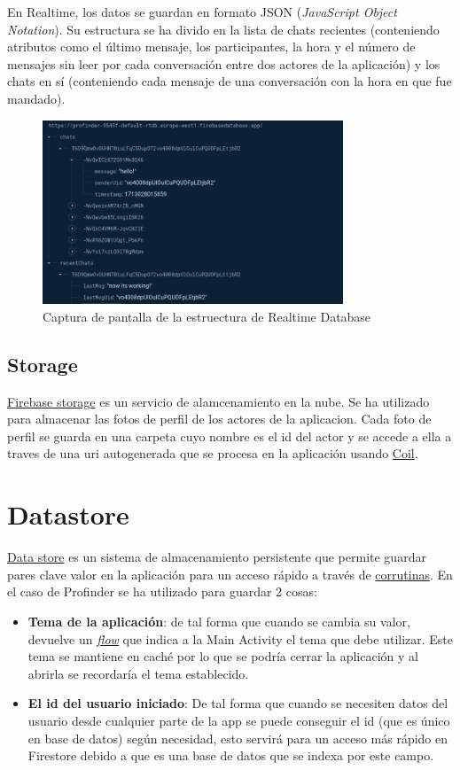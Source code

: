 En Realtime, los datos se guardan en formato JSON (\textit{JavaScript Object Notation}). Su estructura se ha divido en la lista de chats recientes (conteniendo atributos como el último mensaje, los participantes, la hora y el número de mensajes sin leer por cada conversación entre dos actores de la aplicación) y los chats en sí (conteniendo cada mensaje de una conversación con la hora en que fue mandado).
\begin{figure}[h]
    \centering
    \includegraphics[width = 0.8\textwidth]{Imagenes/Fuentes/ejemplo_realtime.png}
    \caption{Captura de pantalla de la estruectura de Realtime Database}
    \label{fig:ejemplo_realtime}
\end{figure}
\subsection{Storage}
\href{https://firebase.google.com/docs/storage/}{Firebase storage} es un servicio de alamcenamiento en la nube. Se ha utilizado para almacenar las fotos de perfil de los actores de la aplicacion. Cada foto de perfil se guarda en una carpeta cuyo nombre es el id del actor y se accede a ella a traves de una uri autogenerada que se procesa en la aplicación usando \hyperlink{subsec:coil}{Coil}.
\section{Datastore}
\href{https://developer.android.com/topic/libraries/architecture/datastore}{Data store} es un sistema de almacenamiento persistente que permite guardar pares clave valor en la aplicación para un acceso rápido a través de \href{https://developer.android.com/kotlin/coroutines}{corrutinas}. 
En el caso de Profinder se ha utilizado para guardar 2 cosas:
\begin{itemize}
    \item \textbf{Tema de la aplicación}: de tal forma que cuando se cambia su valor, devuelve un \href{https://developer.android.com/kotlin/flow}{\textit{flow}} que indica a la Main Activity el tema que debe utilizar. Este tema se mantiene en caché por lo que se podría cerrar la aplicación y al abrirla se recordaría el tema establecido.
    \item \textbf{El id del usuario iniciado}: De tal forma que cuando se necesiten datos del usuario desde cualquier parte de la app se puede conseguir el id (que es único en base de datos) según necesidad, esto servirá para un acceso más rápido en Firestore debido a que es una base de datos que se indexa por este campo.
\end{itemize}

